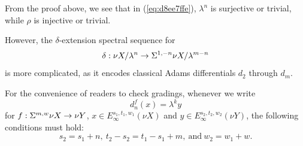 \documentclass{amsart}
\numberwithin{equation}{section}
\begin{document}
\begin{remark}
    From the proof above, we see that in (\ref{eq:d8ee7ffe}), $\lambda^n$ is surjective or trivial, while $\rho$ is injective or trivial.
\end{remark}

However, the $\delta$-extension spectral sequence for
$$\delta:\nu X/\lambda^n\to \Sigma^{1,-n}\nu X/\lambda^{m-n}$$
is more complicated, as it encodes classical Adams differentials $d_2$ through $d_m$.

\begin{remark}
    For the convenience of readers to check gradings, whenever we write 
    $$d_{n}^{f}(x)=\lambda^k y$$
    for $f: \Sigma^{m,w} \nu X\to \nu Y$,
    $x\in E_\infty^{s_1,t_1,w_1}(\nu X)$ and
    $y\in E_\infty^{s_2,t_2,w_2}(\nu Y)$,
    the following conditions must hold: 
    $$s_2=s_1+n, \ t_2-s_2=t_1-s_1+m, \ \text{and} \ w_2=w_1+w.$$
\end{remark}
\end{document}
